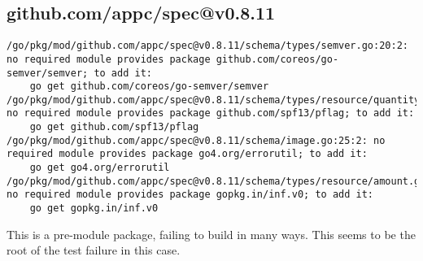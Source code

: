\subsection{github.com/appc/spec@v0.8.11}
\begin{verbatim}
/go/pkg/mod/github.com/appc/spec@v0.8.11/schema/types/semver.go:20:2: no required module provides package github.com/coreos/go-semver/semver; to add it:
	go get github.com/coreos/go-semver/semver
/go/pkg/mod/github.com/appc/spec@v0.8.11/schema/types/resource/quantity.go:28:2: no required module provides package github.com/spf13/pflag; to add it:
	go get github.com/spf13/pflag
/go/pkg/mod/github.com/appc/spec@v0.8.11/schema/image.go:25:2: no required module provides package go4.org/errorutil; to add it:
	go get go4.org/errorutil
/go/pkg/mod/github.com/appc/spec@v0.8.11/schema/types/resource/amount.go:23:2: no required module provides package gopkg.in/inf.v0; to add it:
	go get gopkg.in/inf.v0
\end{verbatim}


This is a pre-module package, failing to build in many ways. This
seems to be the root of the test failure in this case.
